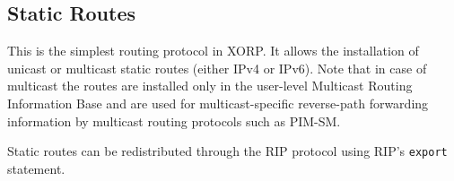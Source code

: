 \documentclass[11pt]{article}
\begin{document}
\subsection{Static Routes}
\label{sec:protocols:static_routes}

This is the simplest routing protocol in XORP. It allows the
installation of unicast or multicast static routes (either IPv4 or
IPv6).  Note that in case of multicast the routes are installed only
in the user-level Multicast Routing Information Base and are used for
multicast-specific reverse-path forwarding information by multicast routing
protocols such as PIM-SM.

\vspace{0.1in}
\noindent{}
\vspace{0.1in}

Static routes can be redistributed through the RIP protocol using RIP's
{\tt export} statement.
\end{document}
